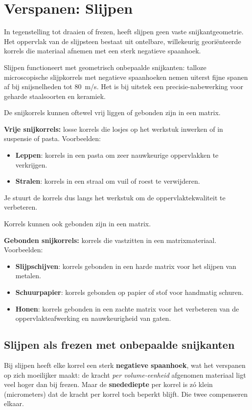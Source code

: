 \documentclass[a4paper,11pt,twoside]{report}
\begin{document}
\chapter{Verspanen: Slijpen}

\begin{conceptbox}
    In tegenstelling tot draaien of frezen, heeft slijpen geen vaste snijkantgeometrie. Het oppervlak van de slijpsteen bestaat uit ontelbare, willekeurig georiënteerde korrels die materiaal afnemen met een sterk negatieve spaanhoek.
\end{conceptbox}

Slijpen functioneert met geometrisch onbepaalde snijkanten: talloze microscopische slijpkorrels met negatieve spaanhoeken nemen uiterst fijne spanen af bij snijsnelheden tot \SI{80}{m/s}. Het is bij uitstek een precisie-nabewerking voor geharde staalsoorten en keramiek.

De snijkorrels kunnen oftewel vrij liggen of gebonden zijn in een matrix.

\textbf{Vrije snijkorrels:} losse korrels die losjes op het werkstuk inwerken of in suspensie of pasta. Voorbeelden:
\begin{itemize}
    \item \textbf{Leppen}: korrels in een pasta om zeer nauwkeurige oppervlakken te verkrijgen.
    \item \textbf{Stralen}: korrels in een straal om vuil of roest te verwijderen.
\end{itemize}
Je stuurt de korrels dus langs het werkstuk om de oppervlaktekwaliteit te verbeteren.

Korrels kunnen ook gebonden zijn in een matrix.

\textbf{Gebonden snijkorrels:} korrels die vastzitten in een matrixmateriaal. Voorbeelden:
\begin{itemize}
    \item \textbf{Slijpschijven}: korrels gebonden in een harde matrix voor het slijpen van metalen.
    \item \textbf{Schuurpapier}: korrels gebonden op papier of stof voor handmatig schuren.
    \item \textbf{Honen}: korrels gebonden in een zachte matrix voor het verbeteren van de oppervlakteafwerking en nauwkeurigheid van gaten.
\end{itemize}


\section{Slijpen als frezen met onbepaalde snijkanten}
Bij slijpen heeft elke korrel een sterk \textbf{negatieve spaanhoek}, wat het verspanen op zich moeilijker maakt:
de kracht \emph{per volume-eenheid} afgenomen materiaal ligt veel hoger dan bij frezen.
Maar de \textbf{snedediepte} per korrel is zó klein (micrometers) dat de kracht per korrel toch beperkt blijft.
Die twee compenseren elkaar.
\end{document}

